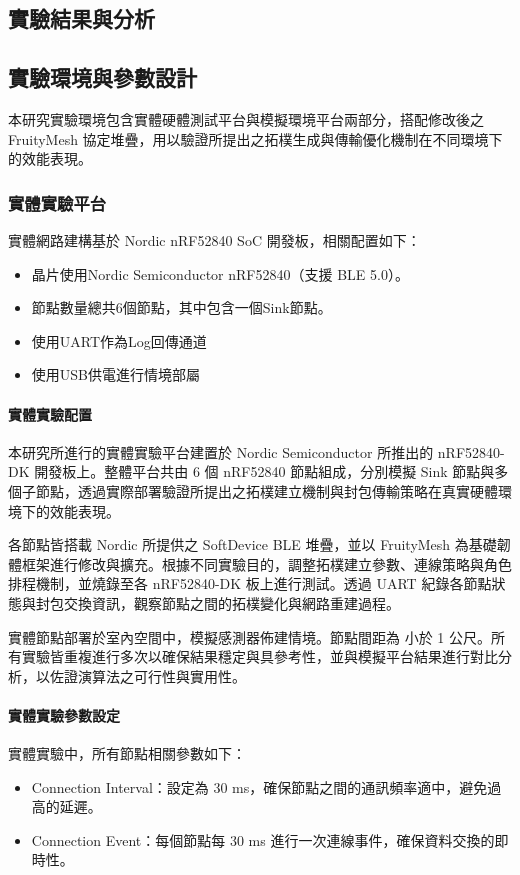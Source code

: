 \begin{ZhChapter}

\chapter{實驗結果與分析}

\section{實驗環境與參數設計}

本研究實驗環境包含實體硬體測試平台與模擬環境平台兩部分，搭配修改後之 FruityMesh 協定堆疊，用以驗證所提出之拓樸生成與傳輸優化機制在不同環境下的效能表現。

\subsection{實體實驗平台}
實體網路建構基於 Nordic nRF52840 SoC 開發板，相關配置如下：
\begin{itemize}
    \item 晶片使用Nordic Semiconductor nRF52840（支援 BLE 5.0）。
    \item 節點數量總共6個節點，其中包含一個Sink節點。
    \item 使用UART作為Log回傳通道
    \item 使用USB供電進行情境部屬
\end{itemize}

\subsubsection{實體實驗配置}
本研究所進行的實體實驗平台建置於 Nordic Semiconductor 所推出的 nRF52840-DK 開發板上。整體平台共由 6 個 nRF52840 節點組成，分別模擬 Sink 節點與多個子節點，透過實際部署驗證所提出之拓樸建立機制與封包傳輸策略在真實硬體環境下的效能表現。

各節點皆搭載 Nordic 所提供之 SoftDevice BLE 堆疊，並以 FruityMesh 為基礎韌體框架進行修改與擴充。根據不同實驗目的，調整拓樸建立參數、連線策略與角色排程機制，並燒錄至各 nRF52840-DK 板上進行測試。透過 UART 紀錄各節點狀態與封包交換資訊，觀察節點之間的拓樸變化與網路重建過程。

實體節點部署於室內空間中，模擬感測器佈建情境。節點間距為 小於 1 公尺。所有實驗皆重複進行多次以確保結果穩定與具參考性，並與模擬平台結果進行對比分析，以佐證演算法之可行性與實用性。
\subsubsection{實體實驗參數設定}
實體實驗中，所有節點相關參數如下：
\begin{itemize}
    \item Connection Interval：設定為 30 ms，確保節點之間的通訊頻率適中，避免過高的延遲。
    \item Connection Event：每個節點每 30 ms 進行一次連線事件，確保資料交換的即時性。
    


\end{itemize}
\end{ZhChapter}
